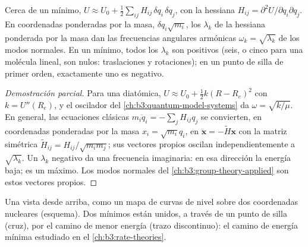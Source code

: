 \begin{proposition}\label{prop:b3:computational-chemistry:hessian}
Cerca de un mínimo, $U \approx U_0 + \frac12\sum_{ij}H_{ij}\,\delta q_i\,\delta q_j$, con
la hessiana $H_{ij} = \partial^2U/\partial q_i\partial q_j$. En coordenadas
ponderadas por la masa, $\delta q_i\sqrt{m_i}$, los  $\lambda_k$ de la
hessiana ponderada por la masa dan las frecuencias angulares armónicas $\omega_k =
\sqrt{\lambda_k}$ de los modos normales. En un mínimo, todos los $\lambda_k$ son
positivos (seis, o cinco para una molécula lineal, son nulos: traslaciones y
rotaciones); en un punto de silla de primer orden, exactamente uno es negativo.
\end{proposition}

\begin{proof}[Demostración parcial]
Para una diatómica, $U \approx U_0 + \frac12k(R - R_e)^2$ con $k = U''(R_e)$, y
el oscilador del \cref{ch:b3:quantum-model-systems} da $\omega =
\sqrt{k/\mu}$. En general, las ecuaciones clásicas $m_i\ddot q_i =
-\sum_jH_{ij}q_j$ se convierten, en coordenadas ponderadas por la masa $x_i = \sqrt{m_i}q_i$,
en $\ddot{\mathbf x} = -\tilde H\mathbf x$ con la matriz simétrica $\tilde H_{ij} =
H_{ij}/\sqrt{m_im_j}$; sus vectores propios oscilan independientemente a
$\sqrt{\lambda_k}$. Un $\lambda_k$ negativo da una frecuencia imaginaria: en
esa dirección la energía baja; es un máximo. Los modos normales del
\cref{ch:b3:group-theory-applied} son estos vectores propios.
\end{proof}

\begin{omfigure}

{\small Una  vista desde arriba, como un mapa de curvas de nivel sobre dos
coordenadas nucleares (esquema). Dos mínimos están unidos, a través de un punto de
silla (cruz), por el camino de menor energía (trazo discontinuo): el camino de energía mínima
estudiado en el \cref{ch:b3:rate-theories}.}
\end{omfigure}

